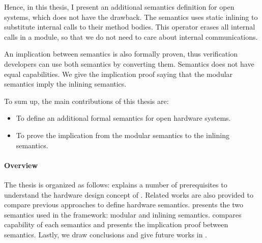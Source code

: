 Hence, in this thesis, I present an additional semantics definition
for open systems, which does not have the drawback. The semantics uses
static inlining to substitute internal calls to their method
bodies. This operator erases all internal calls in a module, so that
we do not need to care about internal communications.

An implication between semantics is also formally proven, thus
verification developers can use both semantics by converting
them. Semantics does not have equal capabilities. We give the
implication proof saying that the modular semantics imply the inlining
semantics.

To sum up, the main contributions of this thesis are:
\begin{itemize}
\item To define an additional formal semantics for open hardware
  systems.
\item To prove the implication from the modular semantics to the
  inlining semantics.
\end{itemize}

\paragraph{Overview}

The thesis is organized as follows: 
explains a number of prerequisites to understand the hardware design
concept of \Bluespec{}. Related works are also provided to compare
previous approaches to define hardware
semantics.  presents the two semantics used in
the \Kami{} framework: modular and inlining
semantics.  compares capability of each
semantics and presents the implication proof between
semantics. Lastly, we draw conclusions and give future works in
.





